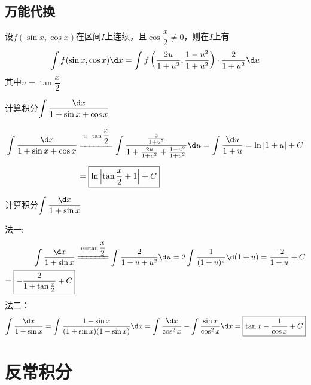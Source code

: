 \documentclass[12pt, a4paper, oneside, UTF8]{ctexbook}
\begin{document}
\subsection{万能代换}
\begin{theorem}
    设$f(\sin x, \cos x)$在区间$I$上连续，且$\cos \dfrac{x}{2} \neq 0$，则在$I$上有
    \[
        \int f(\sin x, \cos x) \d x = \int f\left( \dfrac{2u}{1+u^2}, \dfrac{1-u^2}{1+u^2} \right) \cdot \dfrac{2}{1+u^2} \d u
    \]
    其中$u=\tan \dfrac{x}{2}$
\end{theorem}
\begin{example}
    计算积分$\displaystyle\int \dfrac{\d x}{1+\sin x + \cos x}$
\end{example}
\begin{solution}
    \begin{align*}
        \int \dfrac{\d x}{1+\sin x + \cos x}
        &\xlongequal{u=\tan \dfrac{x}{2}}\int \dfrac{\frac{2}{1+u^2}}{1+\frac{2u}{1+u^2}+\frac{1-u^2}{1+u^2}}\d u
        =\int \dfrac{\d u}{1+u}
        =\ln |1+u|+C\\[6pt]
        &=\boxed{\ln \left|\tan \dfrac{x}{2}+1\right|+C}
    \end{align*}
\end{solution}
\begin{example}
    计算积分$\displaystyle\int \dfrac{\d x}{1+\sin x}$
\end{example}
\begin{solution}
    法一:
    \begin{align*}
        \int \dfrac{\d x}{1+\sin x}
        &\xlongequal{u=\tan \dfrac{x}{2}}\int \dfrac{2}{1+u+u^2}\d u
        =2\int \dfrac{1}{(1+u)^2}\d (1+u)
        =\dfrac{-2}{1+u}+C\\
        =\boxed{-\dfrac{2}{1+\tan \frac{x}{2}}+C}
    \end{align*}
    法二：
    \begin{align*}
        \int \dfrac{\d x}{1+\sin x}
        =\int \dfrac{1-\sin x}{(1+\sin x)(1-\sin x)}\d x
        =\int \dfrac{\d x}{\cos^2 x}-\int \dfrac{\sin x}{\cos^2 x}\d x
        =\boxed{\tan x - \dfrac{1}{\cos x}+C}
    \end{align*}
\end{solution}
\section{反常积分}
\end{document}
